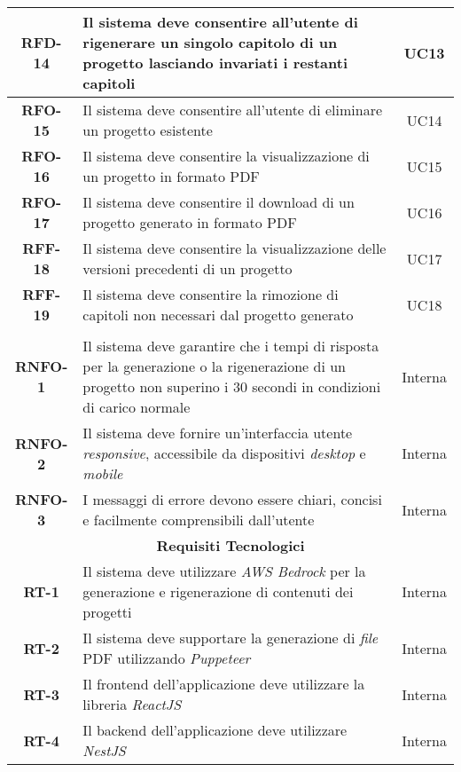 \begin{longtable}{|c|>{\centering\arraybackslash}p{}|c|}
    \textbf{RFD-14} & Il sistema deve consentire all'utente di rigenerare un singolo capitolo di un progetto lasciando invariati i restanti capitoli & UC13 \\
    \hline
    \textbf{RFO-15} & Il sistema deve consentire all'utente di eliminare un progetto esistente & UC14 \\
    \hline
    \textbf{RFO-16} & Il sistema deve consentire la visualizzazione di un progetto in formato PDF & UC15 \\
    \hline
    \textbf{RFO-17} & Il sistema deve consentire il download di un progetto generato in formato PDF & UC16 \\
    \hline
    \textbf{RFF-18} & Il sistema deve consentire la visualizzazione delle versioni precedenti di un progetto & UC17 \\
    \hline
    \textbf{RFF-19} & Il sistema deve consentire la rimozione di capitoli non necessari dal progetto generato & UC18 \\
    \hline
    \pagebreak
    \hline
    \multicolumn{3}{|c|}{\rowcolor{green!30} \textbf{Requisiti Non Funzionali}} \\
    \hline %
    \textbf{RNFO-1} & Il sistema deve garantire che i tempi di risposta per la generazione o la rigenerazione di un progetto non superino i 30 secondi in condizioni di carico normale & Interna \\
    \hline
    \textbf{RNFO-2} & Il sistema deve fornire un’interfaccia utente \textit{responsive}, accessibile da dispositivi \textit{desktop} e \textit{mobile} & Interna \\
    \hline
    \textbf{RNFO-3} & I messaggi di errore devono essere chiari, concisi e facilmente comprensibili dall'utente & Interna \\
    \hline
    \multicolumn{3}{|c|}{\rowcolor{green!30} \textbf{Requisiti Tecnologici}} \\
    \hline
    \textbf{RT-1} & Il sistema deve utilizzare \textit{AWS Bedrock} per la generazione e rigenerazione di contenuti dei progetti & Interna \\
    \hline
    \textbf{RT-2} & Il sistema deve supportare la generazione di \textit{file} PDF utilizzando \textit{Puppeteer} & Interna \\
    \hline
    \textbf{RT-3} & Il \gls{frontend} dell’applicazione deve utilizzare la libreria \textit{ReactJS} & Interna \\
    \hline
    \textbf{RT-4} & Il \gls{backend} dell’applicazione deve utilizzare \textit{NestJS} & Interna \\

\end{longtable}
